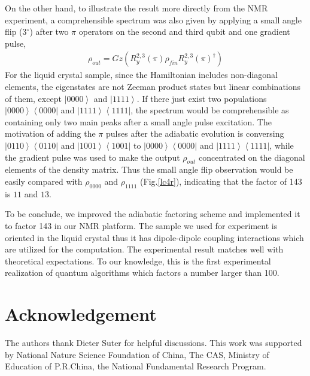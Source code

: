 \documentclass[twocolumn,showpacs,twoside,10pt,prl]{revtex4}
\begin{document}
On the other hand, to illustrate the result more directly from the NMR experiment, a comprehensible spectrum was also given by applying a small angle
flip (3$^{\circ}$) after two $\pi$ operators on the second and third
qubit and one gradient pulse,
\begin{eqnarray}
\rho_{out} = Gz(R_y^{2,3}(\pi)\rho_{fin}R_y^{2,3}(\pi)^{\dagger})
\end{eqnarray}
For the liquid crystal sample, since the Hamiltonian includes non-diagonal elements, the eigenstates are
not Zeeman product states but linear combinations of them, except $\left\vert 0000
\right\rangle$ and $\left\vert 1111
\right\rangle$. If there just exist two populations $\left\vert 0000
\right\rangle \left\langle 0000 \right\vert$ and $\left\vert 1111
\right\rangle \left\langle 1111 \right\vert$, the spectrum would be comprehensible as containing only two main peaks after a small angle pulse excitation.  The motivation of adding the $\pi$
pulses after the adiabatic evolution is conversing $\left\vert 0110
\right\rangle \left\langle 0110 \right\vert$ and $\left\vert 1001
\right\rangle \left\langle 1001 \right\vert$ to $\left\vert 0000
\right\rangle \left\langle 0000 \right\vert$ and $\left\vert 1111
\right\rangle \left\langle 1111 \right\vert$, while the gradient
pulse was used to make the output $\rho_{out}$ concentrated on the
diagonal elements of the density matrix. Thus the small angle flip
observation would be easily compared with $\rho_{0000}$ and
$\rho_{1111}$ (Fig.\ref{lc4r}), indicating that the factor of 143 is $11$ and $13$.















To be conclude, we improved the adiabatic factoring scheme and
implemented it to factor 143 in our NMR platform. The sample we used
for experiment is oriented in the liquid crystal thus it has dipole-dipole
coupling interactions which are utilized for the computation. The
experimental result matches well with theoretical expectations. To
our knowledge, this is the first experimental realization of quantum
algorithms which factors a number larger than 100.



\section{Acknowledgement}

The authors thank Dieter Suter for helpful discussions. This work
was supported by National Nature Science Foundation of China, The
CAS, Ministry of Education of P.R.China, the National Fundamental
Research Program.


\end{document}
